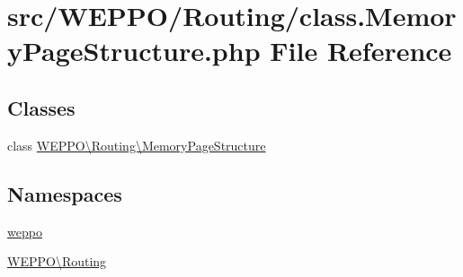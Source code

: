\hypertarget{class_8MemoryPageStructure_8php}{}\section{src/\+W\+E\+P\+P\+O/\+Routing/class.Memory\+Page\+Structure.\+php File Reference}
\label{class_8MemoryPageStructure_8php}
\subsection*{Classes}
\begin{DoxyCompactItemize}
\item 
class \hyperlink{classWEPPO_1_1Routing_1_1MemoryPageStructure}{W\+E\+P\+P\+O\textbackslash{}\+Routing\textbackslash{}\+Memory\+Page\+Structure}
\end{DoxyCompactItemize}
\subsection*{Namespaces}
\begin{DoxyCompactItemize}
\item 
 \hyperlink{namespaceweppo}{weppo}
\item 
 \hyperlink{namespaceWEPPO_1_1Routing}{W\+E\+P\+P\+O\textbackslash{}\+Routing}
\end{DoxyCompactItemize}
